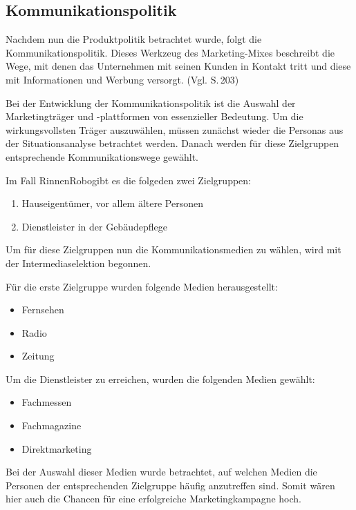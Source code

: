 \subsection{Kommunikationspolitik} \label{Kompo}
    Nachdem nun die Produktpolitik betrachtet wurde, folgt die Kommunikationspolitik. Dieses Werkzeug des 
    Marketing-Mixes beschreibt die Wege, mit denen das Unternehmen mit seinen Kunden in Kontakt tritt und diese mit
    Informationen und Werbung versorgt. (Vgl. \cite{Kuss2016} S.\,203)

    \noindent
    Bei der Entwicklung der Kommunikationspolitik ist die Auswahl der Marketingträger und -plattformen von essenzieller
    Bedeutung. Um die wirkungsvollsten Träger auszuwählen, müssen zunächst wieder die Personas aus der Situationsanalyse
    betrachtet werden. Danach werden für diese Zielgruppen entsprechende Kommunikationswege gewählt.

    \noindent Im Fall \as RinnenRobo\adl gibt es die folgeden zwei Zielgruppen:

    \begin{enumerate}
        \item Hauseigentümer, vor allem ältere Personen
        \item Dienstleister in der Gebäudepflege
    \end{enumerate}

    \noindent Um für diese Zielgruppen nun die Kommunikationsmedien zu wählen, wird mit der Intermediaselektion begonnen.
    
    \noindent Für die erste Zielgruppe wurden folgende Medien herausgestellt:

        \begin{itemize}
            \item Fernsehen
            \item Radio
            \item Zeitung
        \end{itemize}

    \noindent Um die Dienstleister zu erreichen, wurden die folgenden Medien gewählt: 

        \begin{itemize}
            \item Fachmessen
            \item Fachmagazine
            \item Direktmarketing
        \end{itemize}

    \noindent
    Bei der Auswahl dieser Medien wurde betrachtet, auf welchen Medien die Personen der entsprechenden Zielgruppe häufig
    anzutreffen sind. Somit wären hier auch die Chancen für eine erfolgreiche Marketingkampagne hoch.

